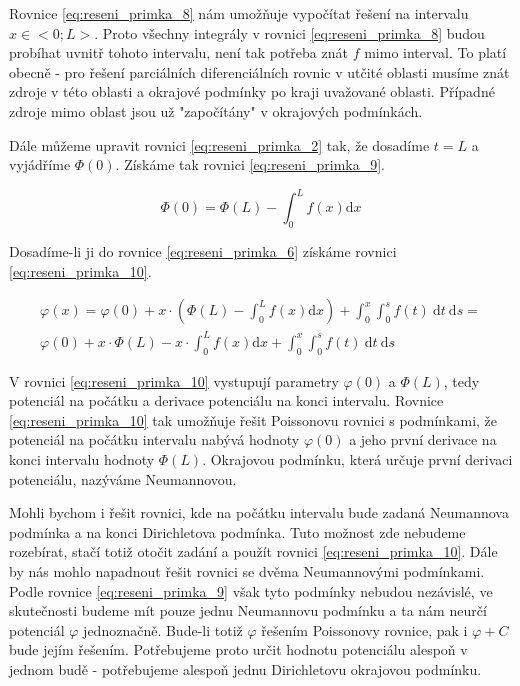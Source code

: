 \documentclass{book}
\begin{document}
Rovnice \eqref{eq:reseni_primka_8} nám umožňuje vypočítat řešení na intervalu \(x \in < 0; L >\). Proto všechny integrály v rovnici \eqref{eq:reseni_primka_8} budou probíhat uvnitř tohoto intervalu, není tak potřeba
znát \(f\) mimo interval. To platí obecně - pro řešení parciálních diferenciálních rovnic v utčité oblasti musíme znát zdroje v této oblasti a okrajové podmínky po kraji uvažované oblasti. Případné zdroje
mimo oblast jsou už "započítány" v okrajových podmínkách.

Dále můžeme upravit rovnici \eqref{eq:reseni_primka_2} tak, že dosadíme \(t = L\) a vyjádříme \(\Phi(0)\). Získáme tak rovnici \eqref{eq:reseni_primka_9}.

\begin{equation}
\label{eq:reseni_primka_9}
\Phi(0) = \Phi(L) - \int_0^L f(x) \mathrm{d}x
\end{equation}

Dosadíme-li ji do rovnice \eqref{eq:reseni_primka_6} získáme rovnici \eqref{eq:reseni_primka_10}.

\begin{equation}
\label{eq:reseni_primka_10}
\begin{split}
\varphi(x) = \varphi(0) + x \cdot \left( \Phi(L) - \int_0^L f(x) \mathrm{d}x \right) + \int_0^x \int_0^s f(t) \ \mathrm{d}t \ \mathrm{d}s = \\
\varphi(0) + x \cdot \Phi(L) - x \cdot \int_0^L f(x) \mathrm{d}x + \int_0^x \int_0^s f(t) \ \mathrm{d}t \ \mathrm{d}s
\end{split}
\end{equation}

V rovnici \eqref{eq:reseni_primka_10} vystupují parametry \(\varphi(0)\) a \(\Phi(L)\), tedy potenciál na počátku a derivace potenciálu na konci intervalu. Rovnice \eqref{eq:reseni_primka_10} tak umožňuje
řešit Poissonovu rovnici s podmínkami, že potenciál na počátku intervalu nabývá hodnoty \(\varphi(0)\) a jeho první derivace na konci intervalu hodnoty \(\Phi(L)\).
Okrajovou podmínku, která určuje první derivaci potenciálu, nazýváme Neumannovou.

Mohli bychom i řešit rovnici, kde na počátku intervalu bude zadaná Neumannova podmínka a na konci Dirichletova podmínka. Tuto možnost zde nebudeme rozebírat, stačí totiž otočit zadání a použít rovnici \eqref{eq:reseni_primka_10}.
Dále by nás mohlo napadnout řešit rovnici se dvěma Neumannovými podmínkami. Podle rovnice \eqref{eq:reseni_primka_9} však tyto podmínky nebudou nezávislé, ve skutečnosti budeme mít pouze jednu Neumannovu podmínku a ta nám neurčí
potenciál \(\varphi\) jednoznačně. Bude-li totiž \(\varphi\) řešením Poissonovy rovnice, pak i \(\varphi + C\) bude jejím řešením. Potřebujeme proto určit hodnotu potenciálu alespoň v jednom budě - potřebujeme alespoň
jednu Dirichletovu okrajovou podmínku.
\end{document}
